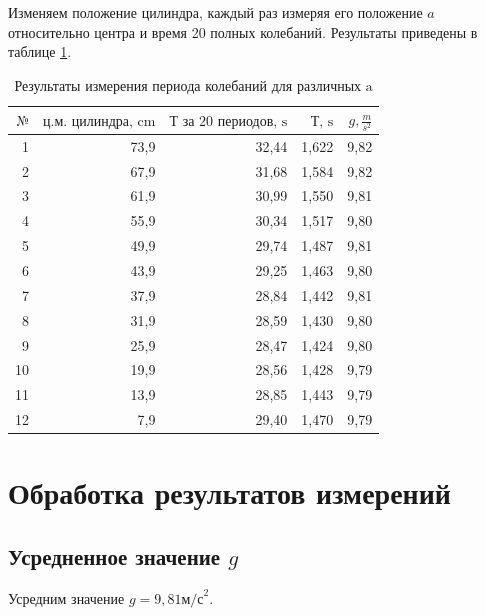 	Изменяем положение цилиндра, каждый раз измеряя его положение $a$ относительно центра и время 20 полных колебаний. Результаты приведены в таблице \ref{tab2}.
	
	
 			\begin{table}[htbp]
 				\centering
 				\caption{Результаты измерения периода колебаний для различных $\text{a}$}
 				\begin{tabular}{|r|r|r|r|r|}
 					\hline
 					$\text{№}$ & $\text{ц.м. цилиндра, cm}$ & $\text{Т за 20 периодов, s}$ &  $\text{Т, s}$ & $g,  \frac{m}{s^2}$ \\
 					\hline
 					1     & 73,9  & 32,44 & 1,622 & 9,82 \\
 					\hline
 					2     & 67,9  & 31,68 & 1,584 & 9,82 \\
 					\hline
 					3     & 61,9  & 30,99 & 1,550 & 9,81 \\
 					\hline
 					4     & 55,9  & 30,34 & 1,517 & 9,80 \\
 					\hline
 					5     & 49,9  & 29,74 & 1,487 & 9,81 \\
 					\hline
 					6     & 43,9  & 29,25 & 1,463 & 9,80 \\
 					\hline
 					7     & 37,9  & 28,84 & 1,442 & 9,81 \\
 					\hline
 					8     & 31,9  & 28,59 & 1,430 & 9,80 \\
 					\hline
 					9     & 25,9  & 28,47 & 1,424 & 9,80 \\
 					\hline
 					10    & 19,9  & 28,56 & 1,428 & 9,79 \\
 					\hline
 					11    & 13,9  & 28,85 & 1,443 & 9,79 \\
 					\hline
 					12    & 7,9   & 29,40 & 1,470 & 9,79 \\
 					\hline
 				\end{tabular}%
 				\label{tab2}
 			\end{table}%
 			
	
	\section{Обработка результатов измерений}
	\subsection{Усредненное значение $g$}
	Усредним значение $g = 9,81 \text{м/с}^2$. 
	
